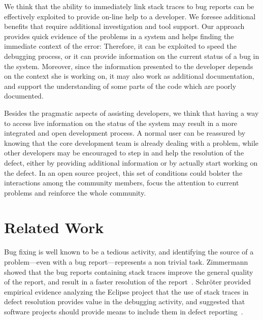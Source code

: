 We think that the ability to immediately link stack traces to bug reports can be effectively exploited to provide on-line help to a developer. We foresee additional benefits that require additional investigation and tool support. Our approach provides quick evidence of the problems in a system and helps finding the immediate context of the error: Therefore, it can be exploited to speed the debugging process, or it can provide information on the current status of a bug in the system. Moreover, since the information presented to the developer depends on the context she is working on, it may also work as additional documentation, and support the understanding of some parts of the code which are poorly documented.

Besides the pragmatic aspects of assisting developers, we think that having a way to access live information on the status of the system may result in a more integrated and open development process. A normal user can be reassured by knowing that the core development team is already dealing with a problem, while other developers may be encouraged to step in and help the resolution of the defect, either by providing additional information or by actually start working on the defect. In an open source project, this set of conditions could bolster the interactions among the community members, focus the attention to current problems and reinforce the whole community.



\section{Related Work}\label{sec:related}

Bug fixing is well known to be a tedious activity, and identifying the source of a problem---even with a bug report---represents a non trivial task. Zimmermann \etal showed that the bug reports containing stack traces improve the general quality of the report, and result in a faster resolution of the report~\cite{Zimm2010a}. Schr\"oter \etal provided empirical evidence analyzing the Eclipse project that the use of stack traces in defect resolution provides value in the debugging activity, and suggested that software projects should provide means to include them in defect reporting~\cite{Schr2010a}.


